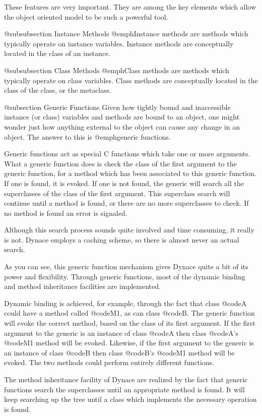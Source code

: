 These features are very important.  They are among the key elements
which allow the object oriented model to be such a powerful tool.

@subsubsection Instance Methods
@emph{Instance methods} are methods which typically operate on instance
variables.  Instance methods are conceptually located in the class of
an instance.

@subsubsection Class Methods
@emph{Class methods} are methods which typically operate on class
variables.  Class methods are conceptually located in the class of
the class, or the metaclass.

@subsection Generic Functions
Given how tightly bound and inaccessible instance (or class) variables and
methods are bound to an object, one might wonder just how anything external
to the object can cause any change in an object.  The answer to this is
@emph{generic functions}.

Generic functions act as special C functions which take one or more
arguments.  What a generic function does is check the class of the first
argument to the generic function, for a method which has been associated
to this generic function.  If one is found, it is evoked.  If one is not
found, the generic will search all the superclasses of the class of
the first argument.  This superclass search will continue until a method
is found, or there are no more superclasses to check.  If no method
is found an error is signaled.

Although this search process sounds quite involved and time consuming, it
really is not.  Dynace employs a caching scheme, so there is almost never
an actual search.

As you can see, this generic function mechanism gives Dynace quite a bit of
its power and flexibility.  Through generic functions, most of the
dynamic binding and method inheritance facilities are implemented.

Dynamic binding is achieved, for example, through the fact that class
@code{A} could have a method called @code{M1}, as can class @code{B}.
The generic function will evoke the correct method, based on the class
of its first argument.  If the first argument to the generic is an
instance of class @code{A} then class @code{A}'s @code{M1} method will
be evoked.  Likewise, if the first argument to the generic is an
instance of class @code{B} then class @code{B}'s @code{M1} method will
be evoked.  The two methods could perform entirely different functions.

The method inheritance facility of Dynace are realized by the fact that
generic functions search the superclasses until an appropriate
method is found.  It will keep searching up the tree until a class
which implements the necessary operation is found.

